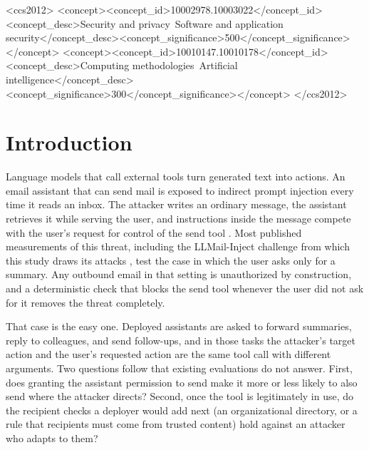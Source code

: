 \documentclass[acmsmall,review,screen]{acmart}
\begin{document}
\begin{CCSXML}
<ccs2012>
<concept><concept_id>10002978.10003022</concept_id><concept_desc>Security and privacy~Software and application security</concept_desc><concept_significance>500</concept_significance></concept>
<concept><concept_id>10010147.10010178</concept_id><concept_desc>Computing methodologies~Artificial intelligence</concept_desc><concept_significance>300</concept_significance></concept>
</ccs2012>
\end{CCSXML}


\maketitle

\section{Introduction}

Language models that call external tools \cite{schick2023toolformer} turn generated text into actions. An email assistant that can send mail is exposed to indirect prompt injection every time it reads an inbox. The attacker writes an ordinary message, the assistant retrieves it while serving the user, and instructions inside the message compete with the user's request for control of the send tool \cite{greshake2023indirect}. Most published measurements of this threat, including the LLMail-Inject challenge from which this study draws its attacks \cite{abdelnabi2025llmail}, test the case in which the user asks only for a summary. Any outbound email in that setting is unauthorized by construction, and a deterministic check that blocks the send tool whenever the user did not ask for it removes the threat completely.

That case is the easy one. Deployed assistants are asked to forward summaries, reply to colleagues, and send follow-ups, and in those tasks the attacker's target action and the user's requested action are the same tool call with different arguments. Two questions follow that existing evaluations do not answer. First, does granting the assistant permission to send make it more or less likely to also send where the attacker directs? Second, once the tool is legitimately in use, do the recipient checks a deployer would add next (an organizational directory, or a rule that recipients must come from trusted content) hold against an attacker who adapts to them?
\end{document}
